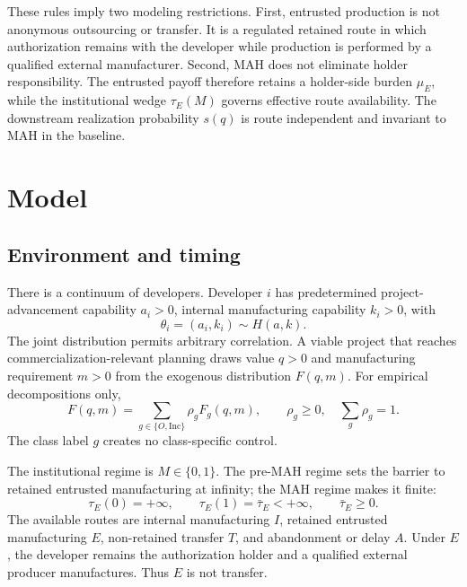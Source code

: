 \documentclass[12pt]{article}
\newcommand{\1}{\mathbf{1}}
\begin{document}
These rules imply two modeling restrictions. First, entrusted production is
not anonymous outsourcing or transfer. It is a regulated retained route in
which authorization remains with the developer while production is performed
by a qualified external manufacturer. Second, MAH does not eliminate holder
responsibility. The entrusted payoff therefore retains a holder-side burden
\(\mu_E\), while the institutional wedge \(\tau_E(M)\) governs effective
route availability. The downstream realization probability \(s(q)\) is
route independent and invariant to MAH in the baseline.

\section{Model}
\label{sec:p16m-model}

\subsection{Environment and timing}
\label{subsec:p16m-environment}

There is a continuum of developers. Developer \(i\) has predetermined
project-advancement capability \(a_i>0\), internal manufacturing capability
\(k_i>0\), with
\begin{equation}
  \theta_i=(a_i,k_i)\sim H(a,k).
  \label{eq:p16m-developer-type}
\end{equation}
The joint distribution permits arbitrary correlation. A viable project that
reaches commercialization-relevant planning draws value \(q>0\) and
manufacturing requirement \(m>0\) from the exogenous distribution \(F(q,m)\).
For empirical decompositions only,
\[
  F(q,m)=\sum_{g\in\{O,\mathrm{Inc}\}}\rho_gF_g(q,m),
  \qquad
  \rho_g\geq0,\quad \sum_g\rho_g=1.
\]
The class label \(g\) creates no class-specific control.

The institutional regime is \(M\in\{0,1\}\). The pre-MAH regime sets the
barrier to retained entrusted manufacturing at infinity; the MAH regime
makes it finite:
\begin{equation}
  \tau_E(0)=+\infty,
  \qquad
  \tau_E(1)=\bar\tau_E<+\infty,
  \qquad \bar\tau_E\geq0.
  \label{eq:p16m-policy}
\end{equation}
The available routes are internal manufacturing \(I\), retained entrusted
manufacturing \(E\), non-retained transfer \(T\), and abandonment or delay
\(A\). Under \(E\), the developer remains the authorization holder and a
qualified external producer manufactures. Thus \(E\) is not transfer.
\end{document}
